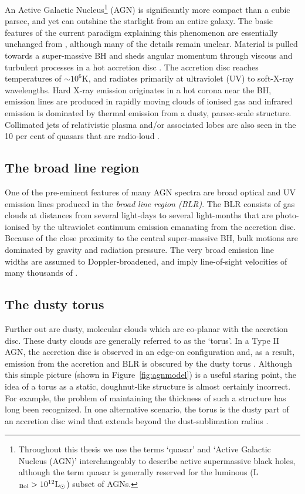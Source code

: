 An Active Galactic Nucleus\footnote{Throughout this thesis we use the terms `quasar' and `Active Galactic Nucleus (AGN)' interchangeably to describe active supermassive black holes, although the term quasar is generally reserved for the luminous (L$_{\rm Bol} > 10^{12}{\rm L}_{\odot}$) subset of AGNs.} (AGN) is significantly more compact than a cubic parsec, and yet can outshine the starlight from an entire galaxy. 
The basic features of the current paradigm explaining this phenomenon are essentially unchanged from \citet{salpeter64}, although many of the details remain unclear.
Material is pulled towards a super-massive BH and sheds angular momentum through viscous and turbulent processes in a hot accretion disc \citep[e.g.][]{begelman85}. 
The accretion disc reaches temperatures of $\sim$$10^6$K, and radiates primarily at ultraviolet (UV) to soft-X-ray wavelengths. 
Hard X-ray emission originates in a hot corona near the BH, emission lines are produced in rapidly moving clouds of ionised gas and infrared emission is dominated by thermal emission from a dusty, parsec-scale structure. 
Collimated jets of relativistic plasma and/or associated lobes are also seen in the 10 per cent of quasars that are radio-loud \citep[e.g.][]{peterson97}. 

\subsection{The broad line region}

One of the pre-eminent features of many AGN spectra are broad optical and UV emission lines produced in the {\em broad line region (BLR)}. 
The BLR consists of gas clouds at distances from several light-days to several light-months that are photo-ionised by the ultraviolet continuum emission emanating from the accretion disc.  
Because of the close proximity to the central super-massive BH, bulk motions are dominated by gravity and radiation pressure.
The very broad emission line widths are assumed to Doppler-broadened, and imply line-of-sight velocities of many thousands of \kms. 

\subsection{The dusty torus}

Further out are dusty, molecular clouds which are co-planar with the accretion disc. 
These dusty clouds are generally referred to as the `torus'. 
In a Type II AGN, the accretion disc is observed in an edge-on configuration and, as a result, emission from the accretion and BLR is obscured by the dusty torus \citep[e.g.][]{antonucci93}.
Although this simple picture (shown in Figure~\ref{fig:agnmodel}) is a useful staring point, the idea of a torus as a static, doughnut-like structure is almost certainly incorrect. 
For example, the problem of maintaining the thickness of such a structure has long been recognized. 
In one alternative scenario, the torus is the dusty part of an accretion disc wind that extends beyond the dust-sublimation radius \citep[e.g.][]{konigl94,everett09,gallagher12,everett05,keating12,elitzur06}. 

